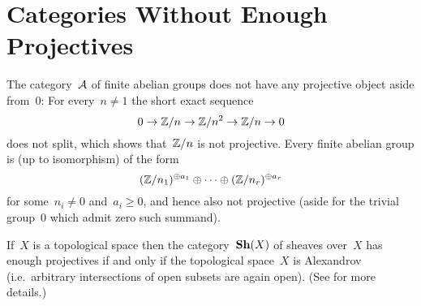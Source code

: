 \section{Categories Without Enough Projectives}


\begin{example}
  The category~$\mathcal{A}$ of finite abelian groups does not have any projective object aside from~$0$:
  For every~$n \neq 1$ the short exact sequence
  \[
    0
    \to
    \mathbb{Z}/n
    \to
    \mathbb{Z}/n^2
    \to
    \mathbb{Z}/n
    \to
    0
  \]
  does not split, which shows that~$\mathbb{Z}/n$ is not projective.
  Every finite abelian group is (up to isomorphism) of the form
  \[
      (\mathbb{Z}/n_1)^{\oplus a_1}
      \oplus
      \dotsb
      \oplus
      (\mathbb{Z}/n_r)^{\oplus a_r}
  \]
  for some~$n_i \neq 0$ and~$a_i \geq 0$, and hence also not projective (aside for the trivial group~$0$ which admit zero such summand).
\end{example}





\begin{example}
  If~$X$ is a topological space then the category~$\mathbf{Sh}(X)$ of sheaves over~$X$ has enough projectives if and only if the topological space~$X$ is Alexandrov (i.e.\ arbitrary intersections of open subsets are again open).
  (See \cite{shXenoughprojectives} for more details.)
\end{example}




